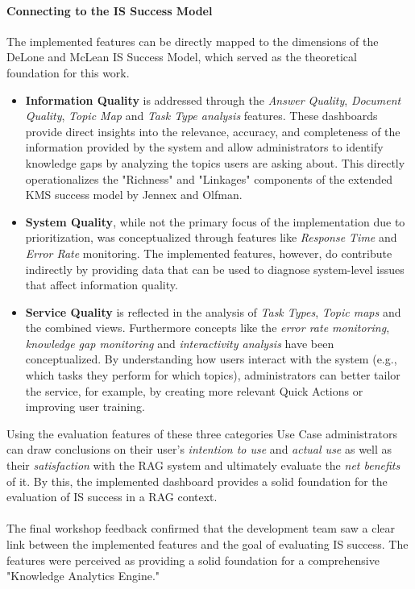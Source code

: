 \documentclass[
	english,
	ruledheaders=section,%
	class=report,%
	thesis={type=bachelor},%
	accentcolor=1b,%
	custommargins=true,%
	marginpar=false,%
	parskip=half-,%
	fontsize=11pt,%
	DIV=14,
]{tudapub}
\begin{document}
\paragraph{Connecting to the IS Success Model} The implemented features can be directly mapped to the dimensions of the DeLone and McLean IS Success Model, which served as the theoretical foundation for this work.
\begin{itemize}
    \item \textbf{Information Quality} is addressed through the \textit{Answer Quality}, \textit{Document Quality}, \textit{Topic Map} and \textit{Task Type analysis} features. These dashboards provide direct insights into the relevance, accuracy, and completeness of the information provided by the system and allow administrators to identify knowledge gaps by analyzing the topics users are asking about. This directly operationalizes the "Richness" and "Linkages" components of the extended KMS success model by Jennex and Olfman.
    \item \textbf{System Quality}, while not the primary focus of the implementation due to prioritization, was conceptualized through features like \textit{Response Time} and \textit{Error Rate} monitoring. The implemented features, however, do contribute indirectly by providing data that can be used to diagnose system-level issues that affect information quality.
    \item \textbf{Service Quality} is reflected in the analysis of \textit{Task Types}, \textit{Topic maps} and the combined views. Furthermore concepts like the \textit{error rate monitoring}, \textit{knowledge gap monitoring} and \textit{interactivity analysis} have been conceptualized. By understanding how users interact with the system (e.g., which tasks they perform for which topics), administrators can better tailor the service, for example, by creating more relevant Quick Actions or improving user training.
\end{itemize}
Using the evaluation features of these three categories Use Case administrators can draw conclusions on their user's \textit{intention to use} and \textit{actual use}  as well as their \textit{satisfaction} with the RAG system and ultimately evaluate the \textit{net benefits} of it. By this, the implemented dashboard provides a solid foundation for the evaluation of IS success in a RAG context.\\
\\
The final workshop feedback confirmed that the development team saw a clear link between the implemented features and the goal of evaluating IS success. The features were perceived as providing a solid foundation for a comprehensive "Knowledge Analytics Engine."
\end{document}
